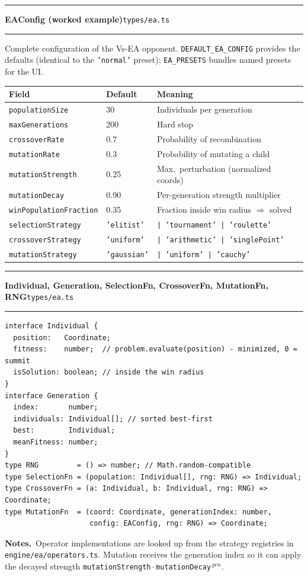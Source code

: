 \documentclass[11pt,a4paper]{report}
\newcommand{\srcfile}[1]{\texttt{\small #1}}   %
\newcommand{\ts}[1]{\texttt{#1}}               %
\newenvironment{apientry}[2]{%
  \par\medskip\noindent
  \begin{minipage}{\textwidth}
  \hrule\vspace{0.6ex}
  {\large\ttfamily\bfseries #1}\hfill{\footnotesize\srcfile{#2}}
  \vspace{0.4ex}\hrule\medskip
}{%
  \end{minipage}\par\medskip
}
\newcommand{\apifield}[1]{\par\smallskip\noindent\textbf{#1.}\ }
\begin{document}
\begin{apientry}{EAConfig (worked example)}{types/ea.ts}
Complete configuration of the Vs-EA opponent. \ts{DEFAULT\_EA\_CONFIG}
provides the defaults (identical to the \ts{'normal'} preset);
\ts{EA\_PRESETS} bundles named presets for the UI.
\begin{center}
\begin{tabularx}{\textwidth}{l l X}
  \toprule
  \textbf{Field} & \textbf{Default} & \textbf{Meaning} \\
  \midrule
  \ts{populationSize}    & 30   & Individuals per generation \\
  \ts{maxGenerations}    & 200  & Hard stop \\
  \ts{crossoverRate}     & 0.7  & Probability of recombination \\
  \ts{mutationRate}      & 0.3  & Probability of mutating a child \\
  \ts{mutationStrength}  & 0.25 & Max.\ perturbation (normalized coords) \\
  \ts{mutationDecay}     & 0.90 & Per-generation strength multiplier \\
  \ts{winPopulationFraction} & 0.35 & Fraction inside win radius $\Rightarrow$ solved \\
  \ts{selectionStrategy} & \ts{'elitist'} & \ts{| 'tournament' | 'roulette'} \\
  \ts{crossoverStrategy} & \ts{'uniform'} & \ts{| 'arithmetic' | 'singlePoint'} \\
  \ts{mutationStrategy}  & \ts{'gaussian'}   & \ts{| 'uniform' | 'cauchy'} \\
  \bottomrule
\end{tabularx}
\end{center}
\end{apientry}

\begin{apientry}{Individual, Generation, SelectionFn, CrossoverFn,
MutationFn, RNG}{types/ea.ts}
\begin{lstlisting}
interface Individual {
  position:   Coordinate;
  fitness:    number;  // problem.evaluate(position) - minimized, 0 = summit
  isSolution: boolean; // inside the win radius
}
interface Generation {
  index:       number;
  individuals: Individual[]; // sorted best-first
  best:        Individual;
  meanFitness: number;
}
type RNG         = () => number; // Math.random-compatible
type SelectionFn = (population: Individual[], rng: RNG) => Individual;
type CrossoverFn = (a: Individual, b: Individual, rng: RNG) => Coordinate;
type MutationFn  = (coord: Coordinate, generationIndex: number,
                    config: EAConfig, rng: RNG) => Coordinate;
\end{lstlisting}
\apifield{Notes}Operator implementations are looked up from the strategy
registries in \srcfile{engine/ea/operators.ts}. Mutation receives the
generation index so it can apply the decayed strength
\ts{mutationStrength}\,$\cdot$\,\ts{mutationDecay}$^{\,gen}$.
\end{apientry}
\end{document}
